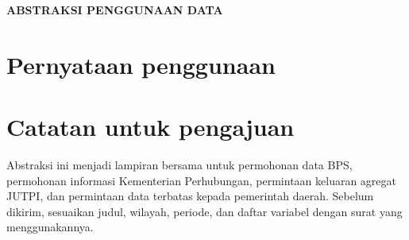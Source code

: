 \documentclass[12pt]{article}
\begin{document}
\KopSurat
\begin{center}
  {\large\bfseries ABSTRAKSI PENGGUNAAN DATA}\\[4pt]
  {\normalsize \JudulSementara}
\end{center}

\vspace{6pt}
\IdentitasMahasiswa

\vspace{12pt}
\AbstraksiPenelitian

\section*{Pernyataan penggunaan}
\PernyataanPenggunaanData

\section*{Catatan untuk pengajuan}
Abstraksi ini menjadi lampiran bersama untuk permohonan data BPS, permohonan informasi Kementerian Perhubungan, permintaan keluaran agregat JUTPI, dan permintaan data terbatas kepada pemerintah daerah. Sebelum dikirim, sesuaikan judul, wilayah, periode, dan daftar variabel dengan surat yang menggunakannya.
\end{document}
